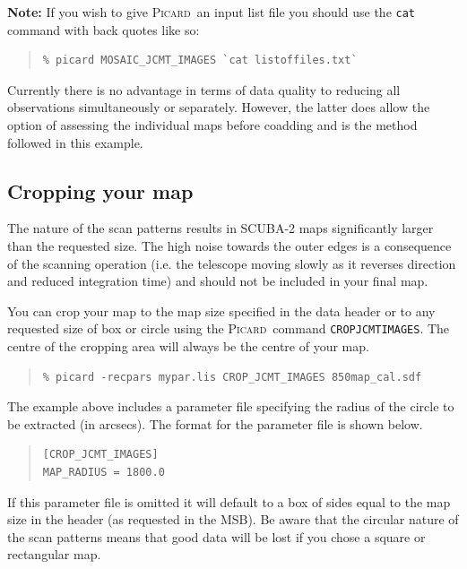 \documentclass[twoside,11pt]{article}
\newcommand{\xref}[3]{#1}
\newcommand{\xlabel}[1]{}
\renewcommand{\_}{\texttt{\symbol{95}}}
\newenvironment{myquote}{\begin{quote}\begin{small}}{\end{small}\end{quote}}
\newcommand{\picard}{\xref{\textsc{Picard}}{sun265}{}}
\newcommand{\param}[1]{\texttt{#1}}
\begin{document}
\textbf{Note:} If you wish to give \picard\ an input list file you should
use the \texttt{cat} command with back quotes like so:
\begin{myquote}
\begin{verbatim}
% picard MOSAIC_JCMT_IMAGES `cat listoffiles.txt`
\end{verbatim}
\end{myquote}


Currently there is no advantage in terms of data quality to reducing
all observations simultaneously or separately. However, the latter
does allow the option of assessing the individual maps before coadding
and is the method followed in this example.

\subsection{\xlabel{crop}Cropping your map}
\label{sec:crop}

The nature of the scan patterns results in SCUBA-2 maps significantly
larger than the requested size. The high noise towards the outer edges
is a consequence of the scanning operation (i.e. the telescope moving
slowly as it reverses direction and reduced integration time) and
should not be included in your final map.

You can crop your map to the map size specified in the data header or
to any requested size of box or circle using the \picard\ command
\xref{\param{CROP\_JCMT\_IMAGES}}{sun265}{CROP_JCMT_IMAGES}. The centre
of the cropping area will always be the centre of your map.
\begin{myquote}
\begin{verbatim}
% picard -recpars mypar.lis CROP_JCMT_IMAGES 850map_cal.sdf
\end{verbatim}
\end{myquote}
The example above includes a parameter file specifying the radius of
the circle to be extracted (in arcsecs). The format for the parameter
file is shown below.
\begin{myquote}
\begin{verbatim}
[CROP_JCMT_IMAGES]
MAP_RADIUS = 1800.0
\end{verbatim}
\end{myquote}
If this parameter file is omitted it will default to a box of sides
equal to the map size in the header (as requested in the MSB). Be
aware that the circular nature of the scan patterns means that good
data will be lost if you chose a square or rectangular map.
\end{document}
